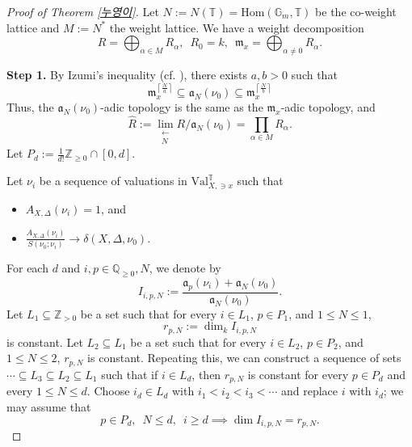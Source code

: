 \documentclass[a4paper,12pt]{amsart}
\theoremstyle{definition} %
\theoremstyle{remark}
\numberwithin{equation}{section}
\newcommand{\Z}{\mathbb{Z}}
\newcommand{\Q}{\mathbb{Q}}
\newcommand{\ceil}[1]{\left\lceil #1 \right \rceil}
\begin{document}
\begin{proof}[Proof of Theorem \ref{누영이}]
Let $N:=N(\mathbb{T})=\mathrm{Hom}(\mathbb{G}_m,\mathbb{T})$ be the co-weight lattice and $M:=N^*$ the weight lattice. We have a weight decomposition
$$ R=\bigoplus_{\alpha\in M}R_{\alpha}, \,\,\,R_0=k,\,\,\, \mathfrak{m}_x=\bigoplus_{\alpha \ne 0}R_{\alpha}.$$

\smallskip

\noindent \textbf{Step 1.} By Izumi's inequality (cf. \cite[Proposition 7.45]{Xu25}), there exists $a,b>0$ such that
\begin{equation} \label{yugang}
\mathfrak{m}^{\ceil{\frac{N}{a}}}_x\subseteq \mathfrak{a}_N(\nu_0)\subseteq \mathfrak{m}^{\ceil{\frac{N}{b}}}_x
\end{equation}
Thus, the $\mathfrak{a}_N(\nu_0)$-adic topology is the same as the $\mathfrak{m}_x$-adic topology, and
$$ \widehat{R}:=\lim_{\substack{\longleftarrow \\ N}}R/\mathfrak{a}_N(\nu_0)=\prod_{\alpha\in M}R_{\alpha}.$$
Let $P_d:=\frac{1}{d!}\Z_{\ge 0}\cap [0,d]$.

\smallskip

Let $\nu_i$ be a sequence of valuations in $\mathrm{Val}^{\mathbb{T}}_{X,\ni x}$ such that
\begin{itemize}
    \item $A_{X,\Delta}(\nu_i)=1$, and
    \item $\frac{A_{X,\Delta}(\nu_i)}{S(\nu_0;\nu_i)}\to \delta(X,\Delta,\nu_0)$.
\end{itemize}
For each $d$ and $i,p\in \Q_{\ge 0},N$, we denote by
$$ I_{i,p,N}:=\frac{\mathfrak{a}_{p}(\nu_i)+\mathfrak{a}_N(\nu_0)}{\mathfrak{a}_N(\nu_0)}.$$
Let $L_1\subseteq \Z_{>0}$ be a set such that for every $i\in L_1$, $p\in P_1$, and $1\le N\le 1$,
$$ r_{p,N}:=\dim_k I_{i,p,N} $$
is constant. Let $L_2\subseteq L_1$ be a set such that for every $i\in L_2$, $p\in P_2$, and $1\le N\le 2$, $r_{p,N}$ is constant. Repeating this, we can construct a sequence of sets $\cdots\subseteq L_3\subseteq L_2\subseteq L_1$ such that if $i\in L_d$, then $r_{p,N}$ is constant for every $p\in P_d$ and every $1\le N\le d$. Choose $i_d\in L_d$ with $i_1<i_2<i_3<\cdots$ and replace $i$ with $i_d$; we may assume that
$$ p\in P_d,\,\,\, N\le d,\,\,\, i\ge d\implies \dim I_{i,p,N}=r_{p,N}.$$

\smallskip


\end{proof}
\end{document}
